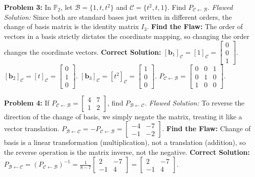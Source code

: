 \documentclass[11pt]{article}
\begin{document}
\textbf{Problem 3:} In $\mathbb{P}_2$, let $\mathcal{B} = \{1, t, t^2\}$ and $\mathcal{C} = \{t^2, t, 1\}$. Find $P_{\mathcal{C} \leftarrow \mathcal{B}}$.
\textit{Flawed Solution:} Since both are standard bases just written in different orders, the change of basis matrix is the identity matrix $I_3$.
\textbf{Find the Flaw:} The order of vectors in a basis strictly dictates the coordinate mapping, so changing the order changes the coordinate vectors.
\textbf{Correct Solution:} $[\mathbf{b}_1]_{\mathcal{C}} = [1]_{\mathcal{C}} = \begin{bmatrix} 0 \\ 0 \\ 1 \end{bmatrix}$. $[\mathbf{b}_2]_{\mathcal{C}} = [t]_{\mathcal{C}} = \begin{bmatrix} 0 \\ 1 \\ 0 \end{bmatrix}$. $[\mathbf{b}_3]_{\mathcal{C}} = [t^2]_{\mathcal{C}} = \begin{bmatrix} 1 \\ 0 \\ 0 \end{bmatrix}$.
$P_{\mathcal{C} \leftarrow \mathcal{B}} = \begin{bmatrix} 0 & 0 & 1 \\ 0 & 1 & 0 \\ 1 & 0 & 0 \end{bmatrix}$.

\vspace{0.5cm}

\textbf{Problem 4:} If $P_{\mathcal{C} \leftarrow \mathcal{B}} = \begin{bmatrix} 4 & 7 \\ 1 & 2 \end{bmatrix}$, find $P_{\mathcal{B} \leftarrow \mathcal{C}}$.
\textit{Flawed Solution:} To reverse the direction of the change of basis, we simply negate the matrix, treating it like a vector translation. $P_{\mathcal{B} \leftarrow \mathcal{C}} = -P_{\mathcal{C} \leftarrow \mathcal{B}} = \begin{bmatrix} -4 & -7 \\ -1 & -2 \end{bmatrix}$.
\textbf{Find the Flaw:} Change of basis is a linear transformation (multiplication), not a translation (addition), so the reverse operation is the matrix inverse, not the negative.
\textbf{Correct Solution:} $P_{\mathcal{B} \leftarrow \mathcal{C}} = (P_{\mathcal{C} \leftarrow \mathcal{B}})^{-1} = \frac{1}{8-7} \begin{bmatrix} 2 & -7 \\ -1 & 4 \end{bmatrix} = \begin{bmatrix} 2 & -7 \\ -1 & 4 \end{bmatrix}$.
\end{document}
